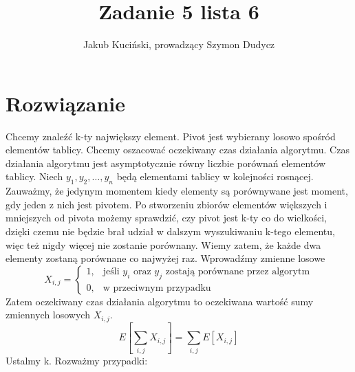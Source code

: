 \documentclass{article}
\title{Zadanie 5 lista 6}
\author{Jakub Kuciński, prowadzący Szymon Dudycz}
\begin{document}
\maketitle

\tableofcontents

\section{Rozwiązanie}
Chcemy znaleźć k-ty największy element. Pivot jest wybierany losowo spośród elementów tablicy. Chcemy oszacować oczekiwany czas działania algorytmu. Czas działania algorytmu jest asymptotycznie równy liczbie porównań elementów tablicy. Niech $y_1, y_2, \ldots, y_n$ będą elementami tablicy w kolejności rosnącej. Zauważmy, że jedynym momentem kiedy elementy są porównywane jest moment, gdy jeden z nich jest pivotem. Po stworzeniu zbiorów elementów większych i mniejszych od pivota możemy sprawdzić, czy pivot jest k-ty co do wielkości, dzięki czemu nie będzie brał udział w dalszym wyszukiwaniu k-tego elementu, więc też nigdy więcej nie zostanie porównany. Wiemy zatem, że każde dwa elementy zostaną porównane co najwyżej raz. Wprowadźmy zmienne losowe 
$$
X_{i, j} =
\begin{cases}
    1, & \text{jeśli $y_i$ oraz $y_j$ zostają porównane przez algorytm} \\
    0, & \text{w przeciwnym przypadku}
\end{cases}
$$
Zatem oczekiwany czas działania algorytmu to oczekiwana wartość sumy zmiennych losowych $X_{i, j}$.
\begin{equation*}
    E\left[\sum_{i,j} X_{i, j}\right] = \sum_{i,j} E\left[ X_{i, j}\right]
\end{equation*}
Ustalmy k. Rozważmy przypadki:
\end{document}
